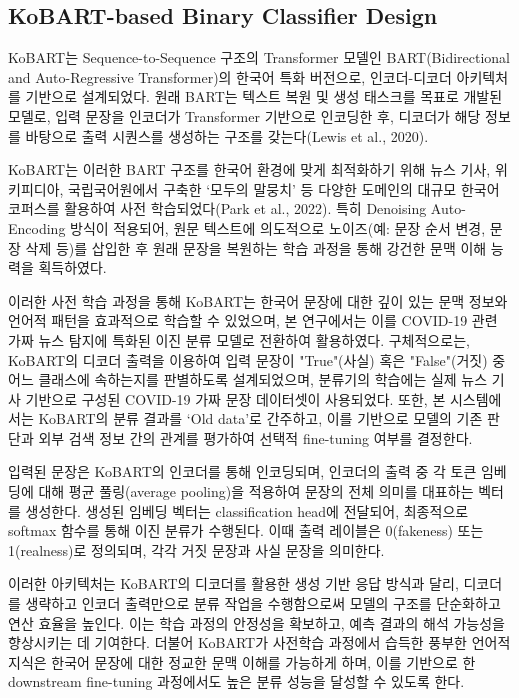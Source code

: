 \documentclass[a4paper,fleqn]{cas-sc}
\begin{document}
\subsection{KoBART-based Binary Classifier Design}

KoBART는 Sequence-to-Sequence 구조의 Transformer 모델인 BART(Bidirectional and Auto-Regressive Transformer)의 한국어 특화 버전으로, 인코더-디코더 아키텍처를 기반으로 설계되었다. 원래 BART는 텍스트 복원 및 생성 태스크를 목표로 개발된 모델로, 입력 문장을 인코더가 Transformer 기반으로 인코딩한 후, 디코더가 해당 정보를 바탕으로 출력 시퀀스를 생성하는 구조를 갖는다(Lewis et al., 2020).

KoBART는 이러한 BART 구조를 한국어 환경에 맞게 최적화하기 위해 뉴스 기사, 위키피디아, 국립국어원에서 구축한 ‘모두의 말뭉치’ 등 다양한 도메인의 대규모 한국어 코퍼스를 활용하여 사전 학습되었다(Park et al., 2022). 특히 Denoising Auto-Encoding 방식이 적용되어, 원문 텍스트에 의도적으로 노이즈(예: 문장 순서 변경, 문장 삭제 등)를 삽입한 후 원래 문장을 복원하는 학습 과정을 통해 강건한 문맥 이해 능력을 획득하였다.

이러한 사전 학습 과정을 통해 KoBART는 한국어 문장에 대한 깊이 있는 문맥 정보와 언어적 패턴을 효과적으로 학습할 수 있었으며, 본 연구에서는 이를 COVID-19 관련 가짜 뉴스 탐지에 특화된 이진 분류 모델로 전환하여 활용하였다. 구체적으로는, KoBART의 디코더 출력을 이용하여 입력 문장이 "True"(사실) 혹은 "False"(거짓) 중 어느 클래스에 속하는지를 판별하도록 설계되었으며, 분류기의 학습에는 실제 뉴스 기사 기반으로 구성된 COVID-19 가짜 문장 데이터셋이 사용되었다. 또한, 본 시스템에서는 KoBART의 분류 결과를 ‘Old data’로 간주하고, 이를 기반으로 모델의 기존 판단과 외부 검색 정보 간의 관계를 평가하여 선택적 fine-tuning 여부를 결정한다.

입력된 문장은 KoBART의 인코더를 통해 인코딩되며, 인코더의 출력 중 각 토큰 임베딩에 대해 평균 풀링(average pooling)을 적용하여 문장의 전체 의미를 대표하는 벡터를 생성한다. 생성된 임베딩 벡터는 classification head에 전달되어, 최종적으로 softmax 함수를 통해 이진 분류가 수행된다. 이때 출력 레이블은 0(fakeness) 또는 1(realness)로 정의되며, 각각 거짓 문장과 사실 문장을 의미한다.

이러한 아키텍처는 KoBART의 디코더를 활용한 생성 기반 응답 방식과 달리, 디코더를 생략하고 인코더 출력만으로 분류 작업을 수행함으로써 모델의 구조를 단순화하고 연산 효율을 높인다. 이는 학습 과정의 안정성을 확보하고, 예측 결과의 해석 가능성을 향상시키는 데 기여한다. 더불어 KoBART가 사전학습 과정에서 습득한 풍부한 언어적 지식은 한국어 문장에 대한 정교한 문맥 이해를 가능하게 하며, 이를 기반으로 한 downstream fine-tuning 과정에서도 높은 분류 성능을 달성할 수 있도록 한다.
\end{document}
